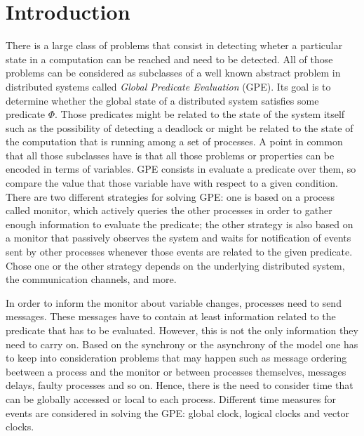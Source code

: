 \documentclass[10pt]{article}
\begin{document}


\vspace{3cm}

\section{Introduction}

There is a large class of problems that consist in detecting wheter a particular state in a computation can be reached and need to be detected.
All of those problems can be considered as subclasses of a well known abstract problem in distributed systems called \textit{Global Predicate Evaluation} (GPE). Its goal is to determine whether the global state of a distributed system satisfies some predicate $\Phi$. Those predicates might be related to the state of the system itself such as the possibility of detecting a deadlock or might be related to the state of the computation that is running among a set of processes. A point in common that all those subclasses have is that all those problems or properties can be encoded in terms of variables. GPE consists in evaluate a predicate over them, so compare the value that those variable have with respect to a given condition. There are two different strategies for solving GPE: one is based on a process called monitor, which actively queries the other processes in order to gather enough information to evaluate the predicate; the other strategy is also based on a monitor that passively observes the system and waits for notification of events sent by other processes whenever those events are related to the given predicate. Chose one or the other strategy depends on the underlying distributed system, the communication channels, and more.

In order to inform the monitor about variable changes, processes need to send messages. These messages have to contain at least information related to the predicate that has to be evaluated. However, this is not the only information they need to carry on. Based on the synchrony or the asynchrony of the model one has to keep into consideration problems that may happen such as message ordering beetween a process and the monitor or between processes themselves, messages delays, faulty processes and so on. Hence, there is the need to consider time that can be globally accessed or local to each process. Different time measures for events are considered in solving the GPE: global clock, logical clocks and vector clocks.
\end{document}
